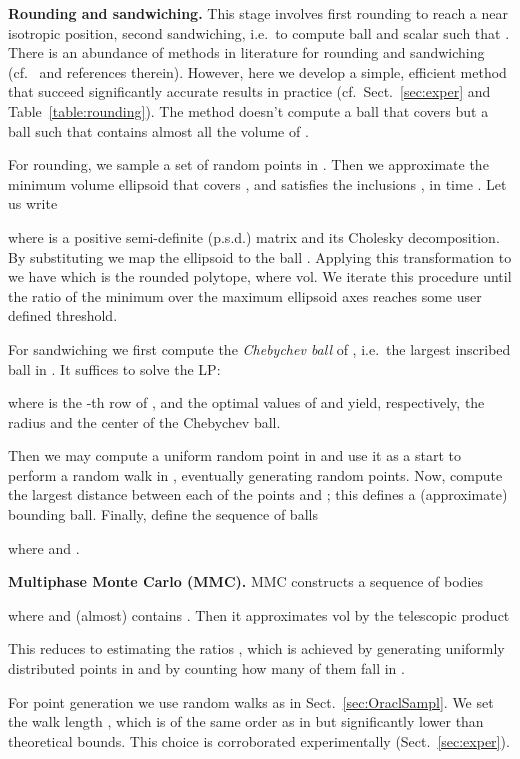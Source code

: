 \documentclass[11pt,a4paper]{article}
\def\vol{\mbox{vol}}
\def\vol{\mbox{vol}}
\begin{document}
\textbf{Rounding and sandwiching.}
This stage involves first rounding  to reach a
near isotropic position, second sandwiching, i.e.\ to compute ball 
and scalar  such that .
There is an abundance of methods in literature for rounding and sandwiching (cf.~\cite{Simonovits03} and references therein). However, here we develop a simple, efficient method that succeed significantly accurate results in practice (cf.\ Sect.~\ref{sec:exper} and Table~\ref{table:rounding}). The method doesn't compute a ball that covers  but a ball  such that  contains almost all the volume of .

For rounding, we sample a set  of  random points in .
Then we approximate the minimum volume ellipsoid  that covers ,
and satisfies the inclusions
,
in time  \cite{Khachiyan96}.
Let us write

where  is a positive semi-definite (p.s.d.) matrix and
 its Cholesky decomposition.
By substituting  we map the ellipsoid to the ball 
. Applying this transformation to  we have  which is the rounded polytope,
where \vol. 
We iterate this procedure until the ratio of the minimum over the maximum ellipsoid axes reaches some user defined threshold.

For sandwiching  we first compute the
{\it Chebychev ball}  of , i.e.\ the largest inscribed ball in .
It suffices to solve the LP:

where  is the -th row of , and
the optimal values of  and  yield, respectively,
the radius  and the center  of the Chebychev ball.

Then we may compute a uniform random point in  and use it as a start
to perform a random walk in , eventually generating  random points.
Now, compute the largest distance between each of the  points and ;
this defines a (approximate) bounding ball.
Finally, define the sequence of balls  

where  and . 

\textbf{Multiphase Monte Carlo (MMC).}
MMC constructs a sequence of bodies 

where  and 
(almost) contains .
Then it approximates vol by the telescopic product

This reduces to estimating the ratios
, which is achieved by 
generating  uniformly distributed points in 
and by counting how many of them fall in .

For point generation we use random walks as in Sect.~\ref{sec:OraclSampl}. 
We set the walk length , which is of the same
order as in \cite{LovaszD12} but significantly lower than theoretical bounds.
This choice is corroborated experimentally (Sect.~\ref{sec:exper}). 
\end{document}
